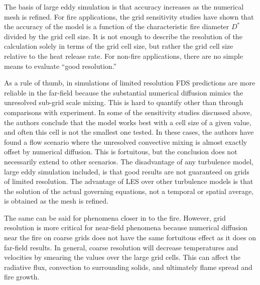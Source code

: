 \documentclass[11pt]{book}
\begin{document}
The basis of  large eddy simulation is that  accuracy increases as the
numerical mesh is refined. For fire applications, the grid sensitivity
studies have shown that the accuracy of the model is a function of the
characteristic fire diameter  $D^*$ divided by the grid  cell size. It
is not enough to describe  the resolution of the calculation solely in
terms of the grid cell size, but rather the grid cell size relative to
the heat release rate.  For non-fire applications, there are no simple
means to evaluate ``good resolution.''

As  a  rule  of  thumb,  in  simulations  of  limited  resolution  FDS
predictions are more reliable in the far-field because the substantial
numerical diffusion mimics the  unresolved sub-grid scale mixing. This
is hard to quantify other than through comparisons with experiment. In
some of the sensitivity  studies discussed above, the authors conclude
that the model works best with a cell size of a given value, and often
this cell is not the smallest  one tested. In these cases, the authors
have found a  flow scenario where the unresolved  convective mixing is
almost exactly offset by  numerical diffusion. This is fortuitous, but
the  conclusion does not  necessarily extend  to other  scenarios. The
disadvantage of any turbulence  model, large eddy simulation included,
is  that  good  results  are   not  guaranteed  on  grids  of  limited
resolution. The advantage of LES  over other turbulence models is that
the  solution of  the actual  governing equations,  not a  temporal or
spatial average, is obtained as the mesh is refined.

The same  can be said  for phenomena closer  in to the  fire. However,
grid  resolution is  more  critical for  near-field phenomena  because
numerical diffusion  near the fire on  coarse grids does  not have the
same fortuitous  effect as it  does on far-field results.  In general,
coarse  resolution  will   decrease  temperatures  and  velocities  by
smearing the  values over  the large grid  cells. This can  affect the
radiative flux, convection to surrounding solids, and ultimately flame
spread and fire growth.








\backmatter


%

%


\end{document}
